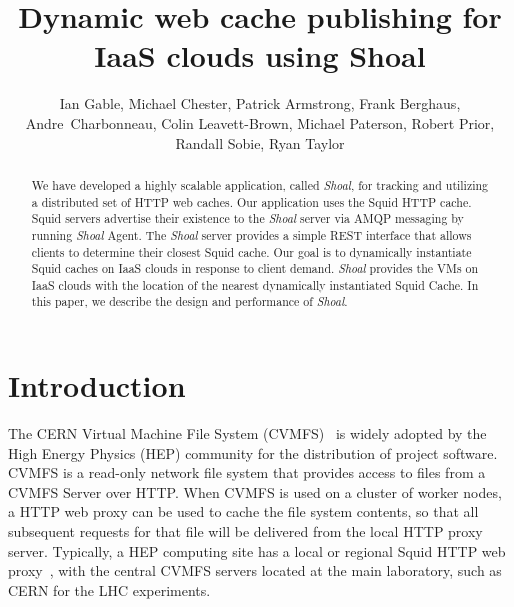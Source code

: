 \documentclass[a4paper]{jpconf}
\begin{document}
\def\shoal{{\it Shoal}\xspace}

\title{Dynamic web cache publishing for IaaS clouds using Shoal}

\author{Ian Gable, 
Michael Chester,
Patrick Armstrong,
Frank Berghaus,
Andre~Charbonneau,
Colin Leavett-Brown, 
Michael Paterson, 
Robert Prior, 
Randall Sobie, 
Ryan Taylor}

\address{: Department of Physics and Astronomy, University of Victoria, Victoria, Canada\\
: Computation Institute, University of Chicago, Chicago, USA\\
: Shared Services Canada, Ottawa, Canada\\
: Institute of Particle Physics of Canada
}



\begin{abstract}

We have developed a highly scalable application, called \shoal, for tracking and 
utilizing a distributed set of HTTP web caches. 
Our application uses the Squid HTTP cache.
Squid servers advertise their existence to the \shoal server via AMQP messaging by running \shoal
Agent.
The \shoal server provides a simple REST interface that allows clients to
determine their closest Squid cache.
Our goal is to dynamically instantiate Squid caches on IaaS
clouds in response to client demand.
\shoal provides the VMs on IaaS clouds with the location of the nearest 
dynamically instantiated Squid Cache.
In this paper, we describe the design and performance of \shoal. 
 
\end{abstract}



\section{Introduction}


The CERN Virtual Machine File System (CVMFS)~\cite{ref:cvmfs}
is widely adopted by the High Energy Physics (HEP) community for
the distribution of project software.
CVMFS is a read-only network file system that provides access to files from a CVMFS
Server over HTTP.
When CVMFS is used on a cluster of worker nodes, a HTTP web proxy 
can be used to cache the file system contents, so that all subsequent requests 
for that file will be delivered from the local HTTP proxy server. 
Typically, a HEP computing site has a local or regional Squid HTTP 
web proxy~\cite{ref:squidproxy}, with the central CVMFS servers located at 
the main laboratory, such as CERN for the LHC experiments.
\end{document}
